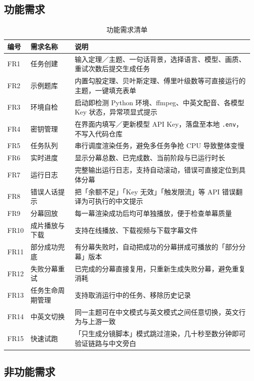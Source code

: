 \documentclass[11pt,a4paper]{ctexart}
\begin{document}
\subsection{功能需求}

\begin{table}[htbp]
\centering
\small
\caption{功能需求清单}
\begin{tabularx}{\textwidth}{@{}p{1.5cm} p{4.1cm} X@{}}
\toprule
\textbf{编号} & \textbf{需求名称} & \textbf{说明} \\
\midrule
FR1 & 任务创建 & 输入定理／主题、一句话背景，选择语言、模型、画质、重试次数后提交生成任务 \\
FR2 & 示例题库 & 内置勾股定理、贝叶斯定理、傅里叶级数等可直接运行的主题，一键填充表单 \\
FR3 & 环境自检 & 启动即检测 Python 环境、ffmpeg、中英文配音、各模型 Key 状态，异常项显式提示 \\
FR4 & 密钥管理 & 在界面内填写／更新模型 API Key，落盘至本地 \texttt{.env}，不写入代码仓库 \\
FR5 & 任务队列 & 串行调度渲染任务，避免多任务争抢 CPU 导致整体变慢 \\
FR6 & 实时进度 & 显示分幕总数、已完成数、当前阶段与已运行时长 \\
FR7 & 运行日志 & 完整输出运行日志，支持自动滚动，错误可直接定位到具体分幕 \\
FR8 & 错误人话提示 & 把「余额不足」「Key 无效」「触发限流」等 API 错误翻译为可执行的中文提示 \\
FR9 & 分幕回放 & 每一幕渲染成功后均可单独播放，便于检查单幕质量 \\
FR10 & 成片播放与下载 & 支持在线播放、下载视频与下载字幕文件 \\
FR11 & 部分成功兜底 & 有分幕失败时，自动把成功的分幕拼成可播放的「部分分幕」版本 \\
FR12 & 失败分幕重试 & 已完成的分幕直接复用，只重新生成失败分幕，避免重复消耗 \\
FR13 & 任务生命周期管理 & 支持取消运行中的任务、移除历史记录 \\
FR14 & 中英文切换 & 同一主题可在中文模式与英文模式之间任意切换，英文行为与上游一致 \\
FR15 & 快速试跑 & 「只生成分镜脚本」模式跳过渲染，几十秒至数分钟即可验证链路与中文旁白 \\
\bottomrule
\end{tabularx}
\end{table}

\subsection{非功能需求}
\end{document}
